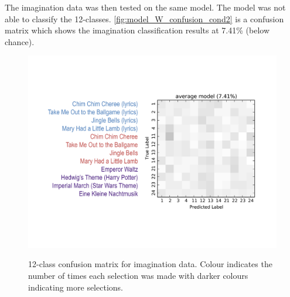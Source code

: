 The imagination data was then tested on the same model. 
The model was not able to classify the 12-classes. 
\autoref{fig:model_W_confusion_cond2} is a confusion matrix which shows the imagination classification results at 7.41\% (below chance). 
\begin{figure}[htb] 
  \begin{center}
    \includegraphics[width=.83\textwidth,keepaspectratio=true]{Figures/model_W_confusion_cond2}
   \\\vspace{-0.8em}
    \caption{12-class confusion matrix for imagination data. Colour indicates the number of times each selection was made with darker colours indicating more selections.}
        \label{fig:model_W_confusion_cond2}
  \end{center}
  \vspace{-1em}
\end{figure}

